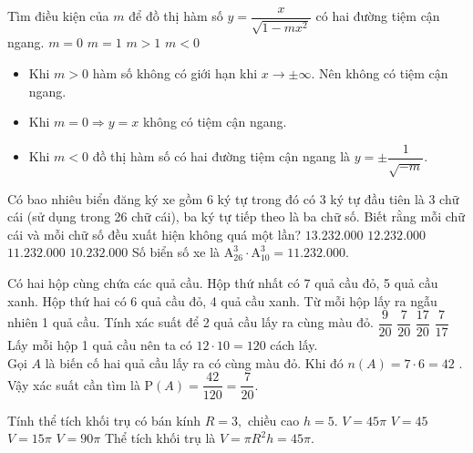 \begin{ex}%
Tìm điều kiện của $ m $ để đồ thị hàm số $ y = \dfrac{x}{\sqrt{1-mx^2}} $ có hai đường tiệm cận ngang.
\choice
{$ m = 0 $}
{$ m = 1 $}
{$ m>1 $}
{\True $m < 0  $}
	\loigiai
	{\begin{itemize}
			\item Khi $ m>0 $ hàm số không có giới hạn khi $ x \to \pm \infty $. Nên không có tiệm cận ngang.
			\item Khi $ m = 0 \Rightarrow y = x $ không có tiệm cận ngang.
			\item Khi $ m < 0 $ đồ thị hàm số có hai đường tiệm cận ngang là $ y = \pm \dfrac{1}{\sqrt{-m}}. $
		\end{itemize}
	}
\end{ex}
\begin{ex}%
 Có bao nhiêu biển đăng ký xe gồm 6 ký tự trong đó có 3 ký tự đầu tiên là 3 chữ cái (sử dụng trong 26 chữ cái), ba ký tự tiếp theo là ba chữ số. Biết rằng mỗi chữ cái và mỗi chữ số đều xuất hiện không quá một lần?
\choice
{$ 13.232.000 $}
{$ 12.232.000 $}
{\True $ 11.232.000 $}
{$ 10.232.000 $}
\loigiai
	{
Số biển số xe là $ \mathrm{A}_{26}^3 \cdot \mathrm{A}_{10}^3 = 11.232.000.$	
	}
\end{ex}
\begin{ex}%
Có hai hộp cùng chứa các quả cầu. Hộp thứ nhất có 7 quả cầu đỏ, 5 quả cầu xanh. Hộp thứ hai có 6 quả cầu đỏ, 4 quả cầu xanh. Từ mỗi hộp lấy ra ngẫu nhiên 1 quả cầu. Tính xác suất để 2 quả cầu lấy ra cùng màu đỏ.
\choice
{$\dfrac{9}{20}$}
{\True $ \dfrac{7}{20} $}
{$\dfrac{17}{20}$}
{$\dfrac{7}{17}$}
	\loigiai
	{Lấy mỗi hộp 1 quả cầu nên ta có $ 12 \cdot 10 = 120 $ cách lấy.\\
	Gọi $ A $	 là biến cố hai quả cầu lấy ra có cùng màu đỏ. Khi đó $ n(A) = 7 \cdot 6 = 42 $ .
	\\ Vậy xác suất cần tìm là $ \mathrm{P}(A) = \dfrac{42}{120} = \dfrac{7}{20}. $
	}
\end{ex}
\begin{ex}%
Tính thể tích khối trụ có bán kính $ R = 3, $ chiều cao $ h = 5. $
\choice
{\True $V = 45 \pi $}
{$V = 45  $}
{$V = 15 \pi $}
{$V = 90 \pi $}
	\loigiai
	{Thể tích khối trụ là $ V = \pi R^2  h = 45 \pi. $
	}
\end{ex}
